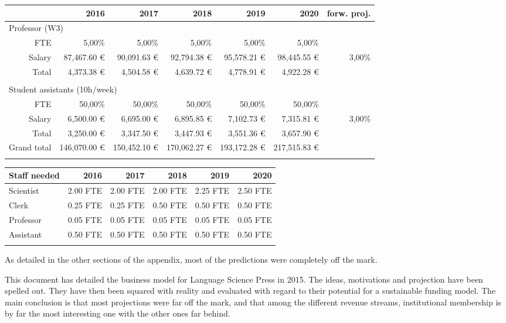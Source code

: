 \documentclass[nonflat,smallfont
]{langsci/langscibook}
\newcommand{\background}[1]{ 
  \vspace{5mm}
  \renewcommand{\tblslinecolour}{lsDarkBlue}
  \tblssy[red]{explore2}{Background}{\vspace*{-5mm}#1}
}
\newcommand{\langscisolution}[1]{
  \renewcommand{\tblslinecolour}{lsLightBlue}
  \tblssy{langsci}{LangSci solution}{\vspace*{-5mm}#1}
}
\newcommand{\evaluation}[1]{
  \renewcommand{\tblslinecolour}{lsLightOrange}
  \tblssy{receipt}{Evaluation}{\vspace*{-5mm}#1}
}
\newcommand{\othersolutions}[1]{
  \renewcommand{\tblslinecolour}{lsDarkGreenOne}
  \tblssy{more}{Other solutions}{\vspace*{-5mm}#1}
}
\renewcommand{\tblssy}[4][black!12]{%
  \renewcommand{\langscisymbol}{#2}\renewcommand{\tblsboxcolor}{#1}
  \begin{mdframed}[style=yellowexercise,frametitle={#3}]
    #4
  \end{mdframed}
}
\begin{document}
{{\begin{tabular}{lrrrrrrr}
& & \textbf{2016} & \textbf{2017} & \textbf{2018} & \textbf{2019} & \textbf{2020} & \textbf{forw. proj.}\\
\midrule 
\multicolumn{5}{l}{ Professor (W3)}\\
\midrule
&  FTE &  5,00\% &  5,00\% &  5,00\% &  5,00\% &  5,00\% & ~\\
&  Salary &  87,467.60 € &  90,091.63 € &  92,794.38 € &  95,578.21 € &  98,445.55 € &  3,00\%\\
 &  Total &  4,373.38 € &  4,504.58 € &  4,639.72 € &  4,778.91 € &  4,922.28 € & ~\\
\\
\multicolumn{5}{l}{ Student assistants (10h/week)}\\
\midrule
&  FTE &  50,00\% &  50,00\% &  50,00\% &  50,00\% &  50,00\% & ~\\
&  Salary &  6,500.00 € &  6,695.00 € &  6,895.85 € &  7,102.73 € &  7,315.81 € &  3,00\%\\
 &  Total &  3,250.00 € &  3,347.50 € &  3,447.93 € &  3,551.36 € &  3,657.90 € & ~\\
\midrule
\multicolumn{2}{l}{Grand total}  &  146,070.00 € &  150,452.10 € &  170,062.27 € &  193,172.28 € &  217,515.83 € & ~\\
\lspbottomrule
\end{tabular}
}

\bigskip
{\footnotesize
\noindent
\begin{tabularx}{\textwidth}{Xrrrrr}
\lsptoprule
Staff needed  & \textbf{2016} & \textbf{2017} & \textbf{2018} & \textbf{2019} & \textbf{2020}\\
\midrule
Scientist &  2.00 FTE &  2.00 FTE &  2.00 FTE &  2.25 FTE &  2.50 FTE\\
Clerk &  0.25 FTE &  0.25 FTE &  0.50 FTE &  0.50 FTE &  0.50 FTE\\
Professor &  0.05 FTE &  0.05 FTE &  0.05 FTE &  0.05 FTE &  0.05 FTE\\
Assistant &  0.50 FTE &  0.50 FTE &  0.50 FTE &  0.50 FTE &  0.50 FTE\\
\lspbottomrule
\end{tabularx} 
}
}
\evaluation{As detailed in the other sections of the appendix, most of the predictions were completely off the mark.}

This document has detailed the business model for Language Science Press in 2015. The ideas, motivations and projection have been spelled out. They have then been squared with reality and evaluated with regard to their potential for a sustainable funding model. The main conclusion is that most projections were far off the mark, and that among the different revenue streams, institutional membership is by far the most interesting one with the other ones far behind. 

\end{document}
